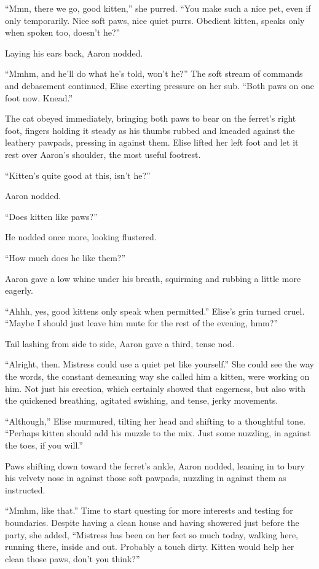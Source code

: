 ``Mmn, there we go, good kitten,'' she purred. ``You make such a nice pet, even if only temporarily. Nice soft paws, nice quiet purrs. Obedient kitten, speaks only when spoken too, doesn't he?''

Laying his ears back, Aaron nodded.

``Mmhm, and he'll do what he's told, won't he?'' The soft stream of commands and debasement continued, Elise exerting pressure on her sub. ``Both paws on one foot now. Knead.''

The cat obeyed immediately, bringing both paws to bear on the ferret's right foot, fingers holding it steady as his thumbs rubbed and kneaded against the leathery pawpads, pressing in against them. Elise lifted her left foot and let it rest over Aaron's shoulder, the most useful footrest.

``Kitten's quite good at this, isn't he?''

Aaron nodded.

``Does kitten like paws?''

He nodded once more, looking flustered.

``How much does he like them?''

Aaron gave a low whine under his breath, squirming and rubbing a little more eagerly.

``Ahhh, yes, good kittens only speak when permitted.'' Elise's grin turned cruel. ``Maybe I should just leave him mute for the rest of the evening, hmm?''

Tail lashing from side to side, Aaron gave a third, tense nod.

``Alright, then. Mistress could use a quiet pet like yourself.'' She could see the way the words, the constant demeaning way she called him a kitten, were working on him. Not just his erection, which certainly showed that eagerness, but also with the quickened breathing, agitated swishing, and tense, jerky movements.

``Although,'' Elise murmured, tilting her head and shifting to a thoughtful tone. ``Perhaps kitten should add his muzzle to the mix. Just some nuzzling, in against the toes, if you will.''

Paws shifting down toward the ferret's ankle, Aaron nodded, leaning in to bury his velvety nose in against those soft pawpads, nuzzling in against them as instructed.

``Mmhm, like that.'' Time to start questing for more interests and testing for boundaries.  Despite having a clean house and having showered just before the party, she added, ``Mistress has been on her feet so much today, walking here, running there, inside and out. Probably a touch dirty. Kitten would help her clean those paws, don't you think?''


